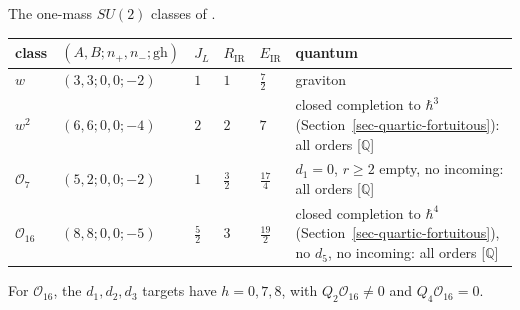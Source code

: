 \documentclass[11pt]{article}
\numberwithin{equation}{section}
\numberwithin{figure}{section}
\numberwithin{table}{section}
\begin{document}
The one-mass $SU(2)$ classes of \cite{CK}.

{\small\renewcommand{\arraystretch}{1.25}\setlength{\tabcolsep}{4pt}
\begin{xltabular}{\linewidth}{@{}lllll>{\raggedright\arraybackslash}X@{}}
\toprule
class & $(A,B;n_+,n_-;\mathrm{gh})$ & $J_L$ & $R_{\mathrm{IR}}$ & $E_{\mathrm{IR}}$ & quantum\\
\midrule\endhead
$w$ & $(3,3;0,0;-2)$ & $1$ & $1$ & $\tfrac72$ & graviton\\
$w^2$ & $(6,6;0,0;-4)$ & $2$ & $2$ & $7$ & closed completion to $\hbar^3$ (Section~\ref{sec-quartic-fortuitous}): all orders [$\mathbb Q$]\\
$\mathcal O_7$ & $(5,2;0,0;-2)$ & $1$ & $\tfrac32$ & $\tfrac{17}4$ & $d_1=0$, $r\ge2$ empty, no incoming: all orders [$\mathbb Q$]\\
$\mathcal O_{16}$ & $(8,8;0,0;-5)$ & $\tfrac52$ & $3$ & $\tfrac{19}2$ & closed completion to $\hbar^4$ (Section~\ref{sec-quartic-fortuitous}), no $d_5$, no incoming: all orders [$\mathbb Q$]\\
\bottomrule
\end{xltabular}}

For $\mathcal O_{16}$, the $d_1,d_2,d_3$ targets have $h=0,7,8$, with $Q_2\mathcal O_{16}\ne0$ and $Q_4\mathcal O_{16}=0$.
\end{document}
